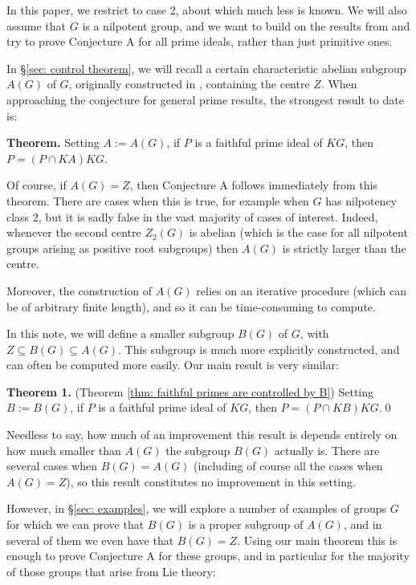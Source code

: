 \documentclass[12pt,a4paper]{article}
\theoremstyle{definition}
\theoremstyle{remark}
\theoremstyle{custthm}
\begin{document}
In this paper, we restrict to case 2, about which much less is known. We will also assume  that $G$ is a nilpotent group, and we want to build on the results from \cite{jones-primitive-ideals} and try to prove Conjecture A for all prime ideals, rather than just primitive ones.

In \S \ref{sec: control theorem}, we will recall a certain characteristic abelian subgroup $A(G)$ of $G$, originally constructed in \cite[\S 3.5]{jones-primitive-ideals}, containing the centre $Z$. When approaching the conjecture for general prime results, the strongest result to date is:

\textbf{Theorem.} \cite[Theorem B]{jones-primitive-ideals} Setting $A:=A(G)$, if $P$ is a faithful prime ideal of $KG$, then $P = (P \cap KA)KG$.

Of course, if $A(G)=Z$, then Conjecture A follows immediately from this theorem. There are cases when this is true, for example when $G$ has nilpotency class 2, but it is sadly false in the vast majority of cases of interest. Indeed, whenever the second centre $Z_2(G)$ is abelian (which is the case for all nilpotent groups arising as positive root subgroups) then $A(G)$ is strictly larger than the centre.

Moreover, the construction of $A(G)$ relies on an iterative procedure (which can be of arbitrary finite length), and so it can be time-consuming to compute.

In this note, we will define a smaller subgroup $B(G)$ of $G$, with $Z\subseteq B(G)\subseteq A(G)$. This subgroup is much more explicitly constructed, and can often be computed more easily. Our main result is very similar:

\textbf{Theorem 1.} (Theorem \ref{thm: faithful primes are controlled by B}) Setting $B:=B(G)$, if $P$ is a faithful prime ideal of $KG$, then $P = (P \cap KB)KG$.\qed

Needless to say, how much of an improvement this result is depends entirely on how much smaller than $A(G)$ the subgroup $B(G)$ actually is. There are several cases when $B(G)=A(G)$ (including of course all the cases when $A(G)=Z$), so this result constitutes no improvement in this setting.

However, in \S \ref{sec: examples}, we will explore a number of examples of groups $G$ for which we can prove that $B(G)$ is a proper subgroup of $A(G)$, and in several of them we even have that $B(G)=Z$. Using our main theorem this is enough to prove Conjecture A for these groups, and in particular for the majority of those groups that arise from Lie theory:
\end{document}
